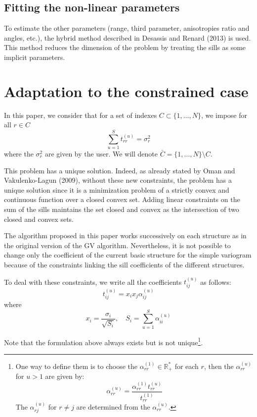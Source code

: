 \documentclass[11pt]{article}
\begin{document}
\subsection{Fitting the non-linear parameters}

To estimate the other parameters (range, third parameter, anisotropies ratio and angles, etc.), the hybrid method described in Desassis and Renard (2013) is used. This method reduces the dimension of the problem by treating the sills as some implicit parameters.

\section{Adaptation to the constrained case}

In this paper, we consider that for a set of indexes $C \subset \{1,\ldots,N\}$, we impose for all $r \in C$
\[
\sum_{u=1}^S t_{rr}^{(u)} = \sigma_r^2
\]
where the $\sigma_r^2$ are given by the user. We will denote $\bar{C} = \{1, \ldots, N\} \setminus C$.

This problem has a unique solution. Indeed, as already stated by Oman and Vakulenko-Lagun (2009), without these new constraints, the problem has a unique solution since it is a minimization problem of a strictly convex and continuous function over a closed convex set. Adding linear constraints on the sum of the sills maintains the set closed and convex as the intersection of two closed and convex sets.

The algorithm proposed in this paper works successively on each structure as in the original version of the GV algorithm. Nevertheless, it is not possible to change only the coefficient of the current basic structure for the simple variogram because of the constraints linking the sill coefficients of the different structures.

To deal with these constraints, we write all the coefficients $t_{ij}^{(u)}$ as follows:
\[
t_{ij}^{(u)} = x_i x_j \alpha_{ij}^{(u)}
\]
where
\[
x_i = \frac{\sigma_i}{\sqrt{S_i}}, \quad S_i = \sum_{u=1}^S \alpha_{ii}^{(u)}
\]

Note that the formulation above always exists but is not unique\footnote{One way to define them is to choose the $\alpha_{rr}^{(1)} \in \mathbb{R}_+^*$ for each $r$, then the $\alpha_{rr}^{(u)}$ for $u > 1$ are given by:
\[
\alpha_{rr}^{(u)} = \frac{\alpha_{rr}^{(1)} t_{rr}^{(u)}}{t_{rr}^{(1)}}
\]
The $\alpha_{rj}^{(u)}$ for $r \ne j$ are determined from the $\alpha_{rr}^{(u)}$.}.
\end{document}
